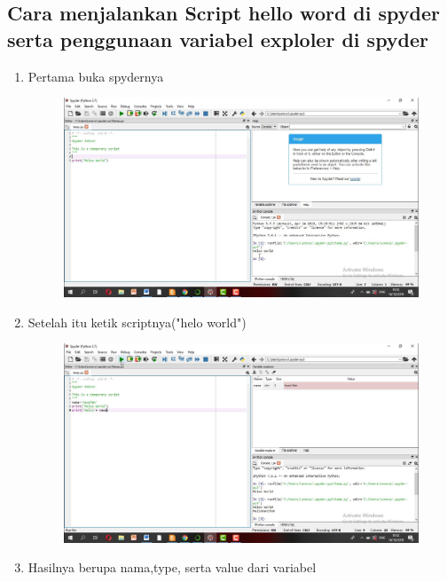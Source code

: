 \begin{enumerate}
\begin{enumerate}
\begin{enumerate}
\begin{enumerate}
\begin{enumerate}
\section*{Cara menjalankan Script hello word di spyder serta penggunaan variabel exploler di spyder}
\begin{enumerate}
\item  Pertama buka spydernya
\begin{figure}[h]
    \centering
    \includegraphics[scale=0.2]{gambar/31.png}
    \caption{}
    \label{fig:my_label}
\end{figure}
\item  Setelah itu ketik scriptnya("helo world")
\begin{figure}[h]
    \centering
    \includegraphics[scale=0.2]{gambar/32.png}
    \caption{}
    \label{fig:my_label}
\end{figure}
\item  Hasilnya berupa nama,type, serta value dari variabel
\begin{figure}[h]
    \centering

\end{figure}
\end{enumerate}
\end{enumerate}
\end{enumerate}
\end{enumerate}
\end{enumerate}
\end{enumerate}
